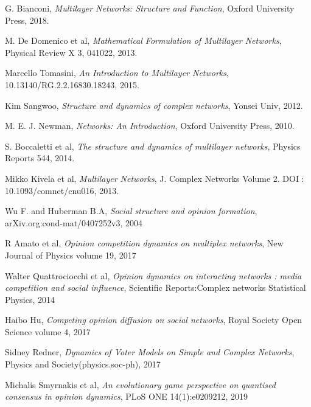 \documentclass[english]{cccconf}
\begin{document}
\begin{thebibliography}{0}
G. Bianconi, \textit{Multilayer Networks: Structure and Function}, Oxford University Press, 2018.

M. De Domenico et al, \textit{Mathematical Formulation of Multilayer Networks}, Physical Review X 3, 041022, 2013.

Marcello Tomasini, \textit{An Introduction to Multilayer Networks}, 10.13140/RG.2.2.16830.18243, 2015.

Kim Sangwoo, \textit{Structure and dynamics of complex networks}, Yonsei Univ, 2012.

M. E. J. Newman, \textit{Networks: An Introduction}, Oxford University Press, 2010.
	
S. Boccaletti et al, \textit{The structure and dynamics of multilayer networks}, Physics Reports 544, 2014.	
	
Mikko Kivela et al, \textit{Multilayer Networks}, J. Complex Networks Volume 2. DOI : 10.1093/comnet/cnu016, 2013.	
	
Wu F. and Huberman B.A, \textit{Social structure and opinion formation}, arXiv.org:cond-mat/0407252v3, 2004	


	
	
	
	
	
R Amato et al, \textit{Opinion competition dynamics on multiplex networks}, New Journal of Physics volume 19, 2017

Walter Quattrociocchi et al, \textit{Opinion dynamics on interacting networks : media competition and social influence}, Scientific Reports:Complex networks Statistical Physics, 2014

Haibo Hu, \textit{Competing opinion diffusion on social networks}, Royal Society Open Science volume 4, 2017




Sidney Redner, \textit{Dynamics of Voter Models on Simple and Complex Networks}, Physics and Society(physics.soc-ph), 2017





Michalis Smyrnakis et al, \textit{An evolutionary game perspective on quantised consensus in opinion dynamics}, PLoS ONE 14(1):e0209212, 2019






\end{thebibliography}
\end{document}
